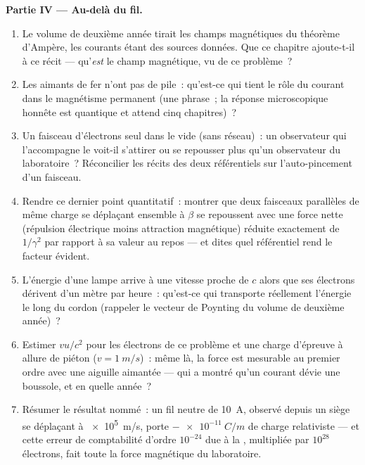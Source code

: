 \begin{problem}
\medskip\noindent\textbf{Partie IV --- Au-delà du fil.}
\begin{enumerate}[resume]
  \item Le volume de deuxième année tirait les champs magnétiques du
        théorème d'Ampère, les courants étant des sources données. Que
        ce chapitre ajoute-t-il à ce récit --- qu'\emph{est} le champ
        magnétique, vu de ce problème~?
  \item Les aimants de fer n'ont pas de pile~: qu'est-ce qui tient le
        rôle du courant dans le magnétisme permanent (une phrase~; la
        réponse microscopique honnête est quantique et attend cinq
        chapitres)~?
  \item Un faisceau d'électrons seul dans le vide (sans réseau)~: un
        observateur qui l'accompagne le voit-il s'attirer ou se
        repousser plus qu'un observateur du laboratoire~? Réconcilier
        les récits des deux référentiels sur l'auto-pincement d'un
        faisceau.
  \item Rendre ce dernier point quantitatif~: montrer que deux
        faisceaux parallèles de même charge se déplaçant ensemble à
        $\beta$ se repoussent avec une force nette (répulsion
        électrique moins attraction magnétique) réduite exactement de
        $1/\gamma^2$ par rapport à sa valeur au repos --- et dites
        quel référentiel rend le facteur évident.
  \item L'énergie d'une lampe arrive à une vitesse proche de $c$ alors
        que ses électrons dérivent d'un mètre par heure~: qu'est-ce qui
        transporte réellement l'énergie le long du cordon (rappeler
        le vecteur de Poynting du volume de deuxième année)~?
  \item Estimer $vu/c^2$ pour les électrons de ce problème et une
        charge d'épreuve à allure de piéton ($v = \qty{1}{m/s}$)~: même
        là, la force est mesurable au premier ordre avec une aiguille
        aimantée --- qui a montré qu'un courant dévie une boussole, et
        en quelle année~?
  \item Résumer le résultat nommé~: un fil neutre de \qty{10}{A},
        observé depuis un siège se déplaçant à \qty{e5}{m/s}, porte
        $-\qty{e-11}{C/m}$ de charge relativiste --- et cette erreur de
        comptabilité d'ordre $10^{-24}$ due à la , multipliée par $10^{28}$ électrons, fait toute la
        force magnétique du laboratoire.
\end{enumerate}
\end{problem}
